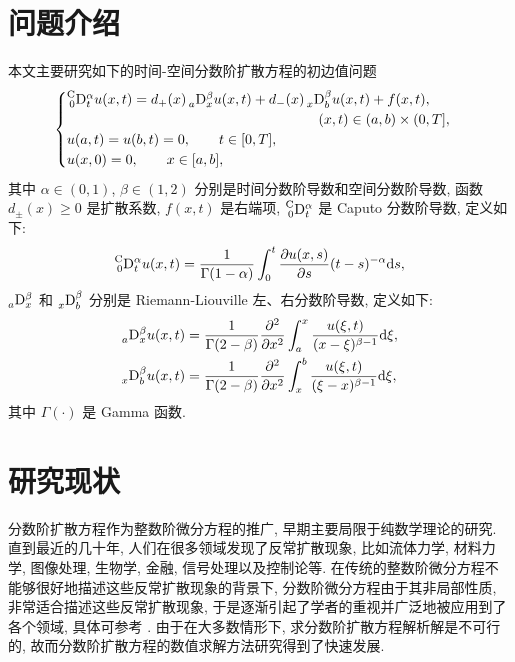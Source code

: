 \documentclass{ecnumaster}
\newcommand{\FDEC}{\prescript{{\mathrm{C}}}{0}{\mathrm{D}}_t^{\alpha}}
\newcommand{\FDEL}{\prescript{}{a}{\mathrm{D}}_x^{\beta}}
\newcommand{\FDER}{\prescript{}{x}{\mathrm{D}}_b^{\beta}}
\begin{document}
\section{问题介绍}
本文主要研究如下的时间-空间分数阶扩散方程的初边值问题
$$
\begin{cases}
\prescript{{\mathrm{C}}}{0}{\mathrm{D}}_t^{\alpha} u(x, t) = d_+(x) \prescript{}{a}{\mathrm{D}}_x^\beta u(x, t) + d_-(x) \prescript{}{x}{\mathrm{D}}_b^\beta u(x, t) + f(x, t), \\
\qquad \qquad \qquad \qquad \qquad \qquad \qquad \qquad \qquad (x, t) \in (a, b) \times (0, T],\\
u(a, t) = u(b, t) = 0,  \qquad t \in [0, T],\\
u(x, 0) = 0, \qquad x \in [a, b],
 \end{cases}
$$
其中 $\alpha\in(0,1)$, $\beta\in(1,2)$ 分别是时间分数阶导数和空间分数阶导数,
函数 $d_{\pm}(x)\geq 0$ 是扩散系数, $f(x, t)$ 是右端项,
$\prescript{{\mathrm{C}}}{0}{\mathrm{D}}_t^{\alpha}$ 是 Caputo 分数阶导数, 定义如下:
$$
 \FDEC u(x, t) = \frac{1}{\Gamma(1-\alpha)}\int_0^t \frac{\partial u(x, s)}{\partial s} (t-s)^{-\alpha}\mathrm{d}s,
$$
$\FDEL$ 和 $\FDER$ 分别是 Riemann-Liouville 左、右分数阶导数, 定义如下:
\begin{align*}
\prescript{}{a}{\mathrm{D}}_x^{\beta} u(x, t) &= \frac{1}{\Gamma(2-\beta)} \frac{\partial ^2}{\partial x^2} \int_a^x \frac{u(\xi, t)}{(x-\xi)^{\beta - 1}}\mathrm{d}\xi, \\
\prescript{}{x}{\mathrm{D}}_b^{\beta} u(x, t) &= \frac{1}{\Gamma(2-\beta)} \frac{\partial ^2}{\partial x^2} \int_x^b \frac{u(\xi, t)}{(\xi - x)^{\beta - 1}}\mathrm{d}\xi,
\end{align*}
其中 $\Gamma(\cdot)$ 是 Gamma 函数.

\section{研究现状} %
分数阶扩散方程作为整数阶微分方程的推广, 早期主要局限于纯数学理论的研究.
直到最近的几十年, 人们在很多领域发现了反常扩散现象, 比如流体力学,
材料力学, 图像处理, 生物学, 金融, 信号处理以及控制论等.
在传统的整数阶微分方程不能够很好地描述这些反常扩散现象的背景下,
分数阶微分方程由于其非局部性质, 非常适合描述这些反常扩散现象\cite{BWM00, CLJTA15},
于是逐渐引起了学者的重视并广泛地被应用到了各个领域,
具体可参考 \cite{A04, BWM06, GDM08, KBD99, MS06, P99}.
由于在大多数情形下, 求分数阶扩散方程解析解是不可行的,
故而分数阶扩散方程的数值求解方法研究得到了快速发展.
\end{document}
